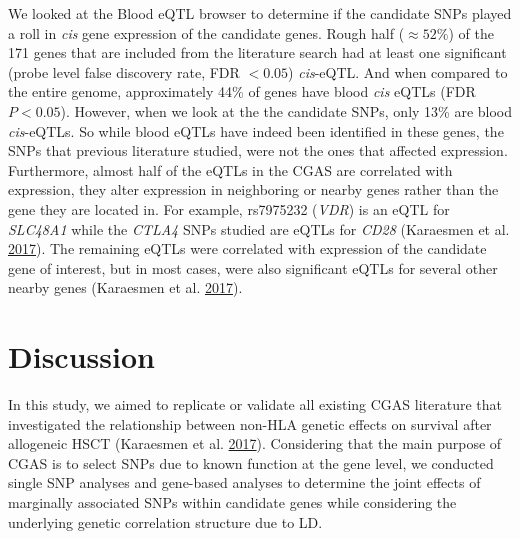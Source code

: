 \documentclass[]{DissertateOSU}
\begin{document}
We looked at the Blood eQTL browser to determine if the candidate SNPs
played a roll in \emph{cis} gene expression of the candidate genes.
Rough half (\(\approx 52\%\)) of the 171 genes that are included from
the literature search had at least one significant (probe level false
discovery rate, FDR \(< 0.05\)) \emph{cis}-eQTL. And when compared to
the entire genome, approximately 44\% of genes have blood \emph{cis}
eQTLs (FDR \(P<0.05\)). However, when we look at the the candidate SNPs,
only 13\% are blood \emph{cis}-eQTLs. So while blood eQTLs have indeed
been identified in these genes, the SNPs that previous literature
studied, were not the ones that affected expression. Furthermore, almost
half of the eQTLs in the CGAS are correlated with expression, they alter
expression in neighboring or nearby genes rather than the gene they are
located in. For example, rs7975232 (\emph{VDR}) is an eQTL for
\emph{SLC48A1} while the \emph{CTLA4} SNPs studied are eQTLs for
\emph{CD28} (Karaesmen et al.
\protect\hyperlink{ref-Karaesmen_2017}{2017}). The remaining eQTLs were
correlated with expression of the candidate gene of interest, but in
most cases, were also significant eQTLs for several other nearby genes
(Karaesmen et al. \protect\hyperlink{ref-Karaesmen_2017}{2017}).

\section{Discussion}\label{discussion-1}

In this study, we aimed to replicate or validate all existing CGAS
literature that investigated the relationship between non-HLA genetic
effects on survival after allogeneic HSCT (Karaesmen et al.
\protect\hyperlink{ref-Karaesmen_2017}{2017}). Considering that the main
purpose of CGAS is to select SNPs due to known function at the gene
level, we conducted single SNP analyses and gene-based analyses to
determine the joint effects of marginally associated SNPs within
candidate genes while considering the underlying genetic correlation
structure due to LD.
\end{document}
